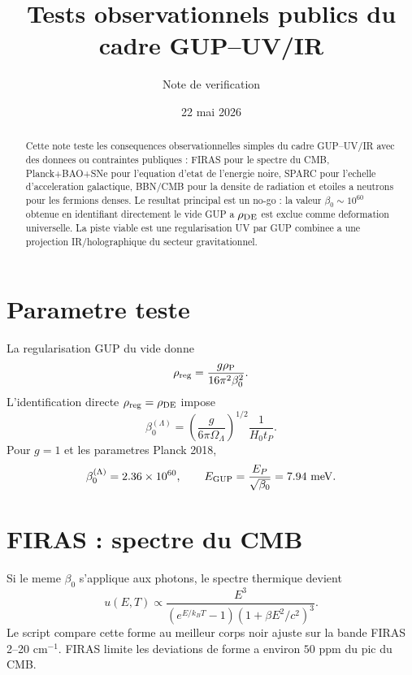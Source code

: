 \documentclass[11pt,a4paper]{article}
\title{Tests observationnels publics du cadre GUP--UV/IR}
\author{Note de verification}
\date{22 mai 2026}
\newcommand{\rhoP}{\rho_{\rm P}}
\newcommand{\rhoDE}{\rho_{\rm DE}}
\newcommand{\EGUP}{E_{\rm GUP}}
\begin{document}
\maketitle

\begin{abstract}
Cette note teste les consequences observationnelles simples du cadre GUP--UV/IR
avec des donnees ou contraintes publiques : FIRAS pour le spectre du CMB,
Planck+BAO+SNe pour l'equation d'etat de l'energie noire, SPARC pour l'echelle
d'acceleration galactique, BBN/CMB pour la densite de radiation et etoiles a
neutrons pour les fermions denses. Le resultat principal est un no-go : la
valeur $\beta_0\sim10^{60}$ obtenue en identifiant directement le vide GUP a
$\rhoDE$ est exclue comme deformation universelle. La piste viable est une
regularisation UV par GUP combinee a une projection IR/holographique du secteur
gravitationnel.
\end{abstract}

\section{Parametre teste}

La regularisation GUP du vide donne
\begin{equation}
\rho_{\rm reg}=\frac{g\rhoP}{16\pi^2\beta_0^2}.
\end{equation}
L'identification directe $\rho_{\rm reg}=\rhoDE$ impose
\begin{equation}
\beta_0^{(\Lambda)}
=
\left(\frac{g}{6\pi\Omega_\Lambda}\right)^{1/2}
\frac{1}{H_0t_P}.
\end{equation}
Pour $g=1$ et les parametres Planck 2018,
\begin{equation}
\beta_0^{(\Lambda)}=2.36\times10^{60},
\qquad
\EGUP=\frac{E_P}{\sqrt{\beta_0}}=7.94~{\rm meV}.
\end{equation}

\section{FIRAS : spectre du CMB}

Si le meme $\beta_0$ s'applique aux photons, le spectre thermique devient
\begin{equation}
u(E,T)\propto
\frac{E^3}{(e^{E/k_BT}-1)(1+\beta E^2/c^2)^3}.
\end{equation}
Le script compare cette forme au meilleur corps noir ajuste sur la bande FIRAS
2--20 cm$^{-1}$. FIRAS limite les deviations de forme a environ $50$ ppm du pic
du CMB.
\end{document}
